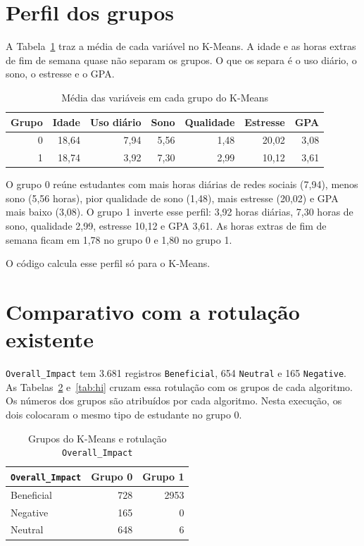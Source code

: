 \documentclass[
  article,
  12pt,
  oneside,
  a4paper,
  english,
  brazil,
  chapter=TITLE,
  section=TITLE,
  subsection=TITLE
]{abntex2}
\begin{document}
\section{Perfil dos grupos}

A Tabela~\ref{tab:perfil} traz a média de cada variável no K-Means. A idade e as horas extras de fim de semana quase não separam os grupos. O que os separa é o uso diário, o sono, o estresse e o GPA.

\begin{table}[htb]
  \centering
  \caption{Média das variáveis em cada grupo do K-Means}
  \label{tab:perfil}
  \footnotesize
  \begin{tabular}{rrrrrrr}
    \toprule
    Grupo & Idade & Uso diário & Sono & Qualidade & Estresse & GPA \\
    \midrule
    0 & 18,64 & 7,94 & 5,56 & 1,48 & 20,02 & 3,08 \\
    1 & 18,74 & 3,92 & 7,30 & 2,99 & 10,12 & 3,61 \\
    \bottomrule
  \end{tabular}
\end{table}

O grupo 0 reúne estudantes com mais horas diárias de redes sociais (7,94), menos sono (5,56 horas), pior qualidade de sono (1,48), mais estresse (20,02) e GPA mais baixo (3,08). O grupo 1 inverte esse perfil: 3,92 horas diárias, 7,30 horas de sono, qualidade 2,99, estresse 10,12 e GPA 3,61. As horas extras de fim de semana ficam em 1,78 no grupo 0 e 1,80 no grupo 1.

O código calcula esse perfil só para o K-Means.

\section{Comparativo com a rotulação existente}

\texttt{Overall\_Impact} tem 3.681 registros \texttt{Beneficial}, 654 \texttt{Neutral} e 165 \texttt{Negative}. As Tabelas~\ref{tab:km} e~\ref{tab:hi} cruzam essa rotulação com os grupos de cada algoritmo. Os números dos grupos são atribuídos por cada algoritmo. Nesta execução, os dois colocaram o mesmo tipo de estudante no grupo 0.

\begin{table}[htb]
  \centering
  \caption{Grupos do K-Means e rotulação \texttt{Overall\_Impact}}
  \label{tab:km}
  \begin{tabular}{lrr}
    \toprule
    \texttt{Overall\_Impact} & Grupo 0 & Grupo 1 \\
    \midrule
    Beneficial & 728 & 2953 \\
    Negative & 165 & 0 \\
    Neutral & 648 & 6 \\
    \bottomrule
  \end{tabular}
\end{table}
\end{document}
